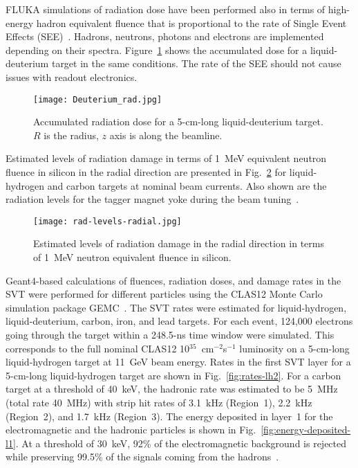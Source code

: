 FLUKA simulations of radiation dose have been performed also in terms of high-energy hadron equivalent fluence
that is proportional to the rate of Single Event Effects (SEE)~\cite{FLUKA3}. Hadrons, neutrons, photons and
electrons are implemented depending on their spectra. Figure~\ref{fig:fluka4} shows the accumulated dose for a
liquid-deuterium target in the same conditions. The rate of the SEE should not cause issues with readout electronics.

\begin{figure}[hbt] 
\texttt{[image: Deuterium\_rad.jpg]}
\caption{Accumulated radiation dose for a 5-cm-long liquid-deuterium target. $R$ is the radius, $z$ axis is along
  the beamline.}
\label{fig:fluka4}
\end{figure}

Estimated levels of radiation damage in terms of 1~MeV equivalent neutron fluence in silicon in the radial direction
are presented in Fig.~\ref{fig:rad-levels-radial} for liquid-hydrogen and carbon targets at nominal beam currents.
Also shown are the radiation levels for the tagger magnet yoke during the beam tuning~\cite{beamline-nim}.

\begin{figure}[hbt] 
\texttt{[image: rad-levels-radial.jpg]}
\caption{Estimated levels of radiation damage in the radial direction in terms of 1~MeV neutron equivalent fluence in
  silicon.}
\label{fig:rad-levels-radial}
\end{figure}

Geant4-based calculations of fluences, radiation doses, and damage rates in the SVT were performed for
different particles using the CLAS12 Monte Carlo simulation package GEMC~\cite{sim-nim}. The SVT rates were
estimated for liquid-hydrogen, liquid-deuterium, carbon, iron, and lead targets. For each event, 124,000 electrons
going through the target within a 248.5-ns time window were simulated. This corresponds to the full nominal
CLAS12 10$^{35}$~cm$^{-2}$s$^{-1}$ luminosity on a 5-cm-long liquid-hydrogen target at 11~GeV beam energy. Rates
in the first SVT layer for a 5-cm-long liquid-hydrogen target are shown in Fig.~\ref{fig:rates-lh2}. For a carbon
target at a threshold of 40~keV, the hadronic rate was estimated to be 5~MHz (total rate 40~MHz) with strip hit
rates of 3.1~kHz (Region~1), 2.2~kHz (Region~2), and 1.7~kHz (Region~3). The energy deposited in layer~1 for the
electromagnetic and the hadronic particles is shown in Fig.~\ref{fig:energy-deposited-l1}. At a threshold of 30~keV,
92\% of the electromagnetic background is rejected while preserving 99.5\% of the signals coming from the
hadrons~\cite{TDRSVT}.

